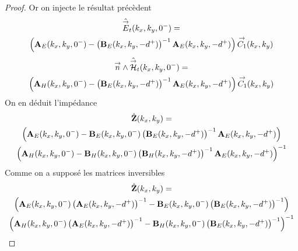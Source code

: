 \begin{proof}
            Or on injecte le résultat précèdent
            \begin{multline*}
                \hat {{\overset{\rightarrow}{E}}}_t(k_x,k_y,0^-) =
                \\
                \left(\mathbf{A}_E(k_x,k_y,0^-)-\left(\mathbf{B}_E(k_x,k_y,-d^+)\right)^{-1}\mathbf{A}_E(k_x,k_y,-d^+)\right){\overset{\rightarrow}{C_1}}(k_x,k_y)
            \end{multline*}
            \begin{multline*}
                {\overset{\rightarrow}{n}} \wedge \hat {{\overset{\rightarrow}{\mathcal{H}}}}_t(k_x,k_y,0^-) =
                \\
                \left(\mathbf{A}_H(k_x,k_y,0^-)-\left(\mathbf{B}_E(k_x,k_y,-d^+)\right)^{-1}\mathbf{A}_E(k_x,k_y,-d^+)\right){\overset{\rightarrow}{C_1}}(k_x,k_y)
            \end{multline*}
            On en déduit l'impédance
            \begin{multline*}
                \hat {\mathbf{Z}}(k_x,k_y) =
                \\
                \left(\mathbf{A}_E(k_x,k_y,0^-)-\mathbf{B}_E(k_x,k_y,0^-)\left(\mathbf{B}_E(k_x,k_y,-d^+)\right)^{-1}\mathbf{A}_E(k_x,k_y,-d^+)\right)
                \\
                \left(\mathbf{A}_H(k_x,k_y,0^-)-\mathbf{B}_H(k_x,k_y,0^-)\left(\mathbf{B}_H(k_x,k_y,-d^+)\right)^{-1}\mathbf{A}_E(k_x,k_y,-d^+)\right)^{-1}
            \end{multline*}
            Comme on a supposé les matrices inversibles
            \begin{multline*}
                \hat {\mathbf{Z}}(k_x,k_y) =
                \\ \left(\mathbf{A}_E(k_x,k_y,0^-)\left(\mathbf{A}_E(k_x,k_y,-d^+)\right)^{-1}-\mathbf{B}_E(k_x,k_y,0^-)\left(\mathbf{B}_E(k_x,k_y,-d^+)\right)^{-1}\right) 
                \\
                \left(\mathbf{A}_H(k_x,k_y,0^-)\left(\mathbf{A}_E(k_x,k_y,-d^+)\right)^{-1}-\mathbf{B}_H(k_x,k_y,0^-)\left(\mathbf{B}_E(k_x,k_y,-d^+)\right)^{-1}\right)^{-1}
            \end{multline*}


\end{proof}
